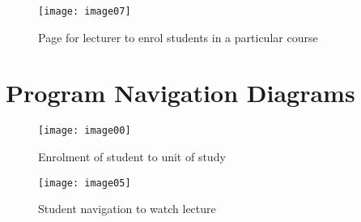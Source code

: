 \documentclass{article}
\begin{document}
\begin{figure}[h!]
\centering
\texttt{[image: image07]}
\caption{Page for lecturer to enrol students in a particular course}
\end{figure}

\clearpage
\section{Program Navigation Diagrams}
\begin{figure}[h!]
\centering
\texttt{[image: image00]}
\caption{Enrolment of student to unit of study}
\end{figure}

\begin{figure}[h!]
\centering
\texttt{[image: image05]}
\caption{Student navigation to watch lecture}
\end{figure}

\clearpage
\end{document}
